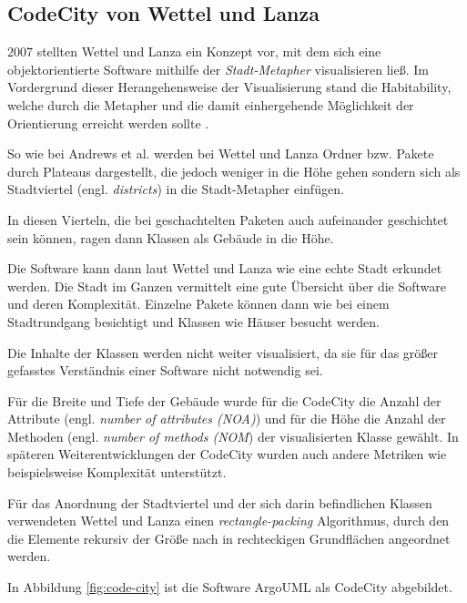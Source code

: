 \subsection{CodeCity von Wettel und Lanza}
\label{subsec:code-city}
 2007 stellten Wettel und Lanza ein Konzept vor, mit dem sich eine objektorientierte Software mithilfe der \textit{Stadt-Metapher} visualisieren ließ. Im Vordergrund dieser Herangehensweise der Visualisierung stand die Habitability, welche durch die Metapher und die damit einhergehende Möglichkeit der Orientierung erreicht werden sollte \cite{wettel2007Program}.
 
So wie bei Andrews et al. werden bei Wettel und Lanza Ordner bzw. Pakete durch Plateaus dargestellt, die jedoch weniger in die Höhe gehen sondern sich als Stadtviertel (engl. \textit{districts}) in die Stadt-Metapher einfügen.

In diesen Vierteln, die bei geschachtelten Paketen auch aufeinander geschichtet sein können, ragen dann Klassen als Gebäude in die Höhe.

Die Software kann dann laut Wettel und Lanza wie eine echte Stadt erkundet werden. Die Stadt im Ganzen vermittelt eine gute Übersicht über die Software und deren Komplexität. Einzelne Pakete können dann wie bei einem Stadtrundgang besichtigt und Klassen wie Häuser besucht werden.

Die Inhalte der Klassen werden nicht weiter visualisiert, da sie für das größer gefasstes Verständnis einer Software nicht notwendig sei.

Für die Breite und Tiefe der Gebäude wurde für die CodeCity die Anzahl der Attribute (engl. \textit{number of attributes (NOA)}) und für die Höhe die Anzahl der Methoden (engl. \textit{number of methods (NOM}) der visualisierten Klasse gewählt. In späteren Weiterentwicklungen der CodeCity wurden auch andere Metriken wie beispielsweise Komplexität unterstützt.

Für das Anordnung der Stadtviertel und der sich darin befindlichen Klassen verwendeten Wettel und Lanza einen \textit{rectangle-packing} \cite{wettel2007Program} Algorithmus, durch den die Elemente rekursiv der Größe nach in rechteckigen Grundflächen angeordnet werden.

In Abbildung \ref{fig:code-city} ist die Software ArgoUML als CodeCity abgebildet.


